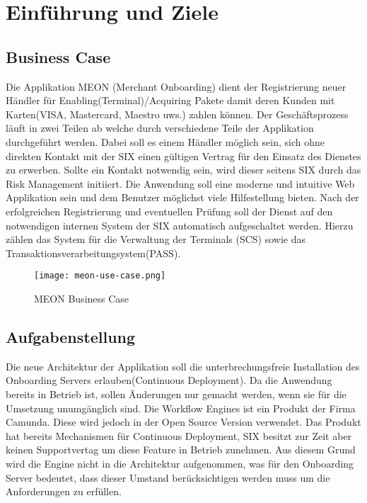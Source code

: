 \graphicspath{{./images/}}


\chapter{Einführung und Ziele}

\section{Business Case}
\label{businesscase}

Die Applikation MEON (Merchant Onboarding) dient der Registrierung neuer Händler für Enabling(Terminal)/Acquiring Pakete damit deren Kunden mit Karten(VISA, Mastercard, Maestro uws.) zahlen können. Der Geschäftsprozess läuft in zwei Teilen ab welche durch verschiedene Teile der Applikation durchgeführt werden.  Dabei soll es einem Händler möglich sein, sich ohne direkten Kontakt mit der SIX einen gültigen Vertrag für den Einsatz des Dienstes zu erwerben. Sollte ein Kontakt notwendig sein, wird dieser seitens SIX durch das Risk Management initiiert.\newline
Die Anwendung soll eine moderne und intuitive Web Applikation sein und dem Benutzer möglichst viele Hilfestellung bieten. Nach der erfolgreichen Registrierung und  eventuellen Prüfung soll der Dienst auf den notwendigen internen System der SIX automatisch aufgeschaltet werden. Hierzu zählen das System für die Verwaltung der Terminals (SCS) sowie das Transaktionsverarbeitungsystem(PASS).

\begin{figure}[H]
	\centering
	\texttt{[image: meon-use-case.png]}
	\caption{MEON Business Case}
\end{figure}
\newpage
\section{Aufgabenstellung}

Die neue Architektur der Applikation soll die unterbrechungsfreie Installation des Onboarding Servers erlauben(Continuous Deployment). Da die Anwendung bereits in Betrieb ist, sollen Änderungen nur gemacht werden, wenn sie für die Umsetzung unumgänglich sind. \newline Die Workflow Engines ist ein Produkt der Firma Camunda. Diese wird jedoch in der Open Source Version verwendet. Das Produkt hat bereits Mechanismen für Continuous Deployment, SIX besitzt zur Zeit aber keinen Supportvertag um diese Feature in Betrieb zunehmen. Aus diesem Grund wird die Engine nicht in die Architektur aufgenommen, was für den  Onboarding Server bedeutet, dass dieser Umstand berücksichtigen werden muss um die Anforderungen zu erfüllen.

